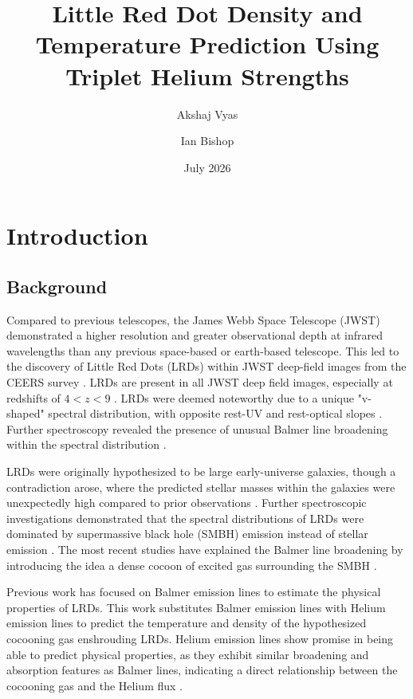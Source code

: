 \documentclass[letterpaper]{aastex701}
\begin{document}
\title{Little Red Dot Density and Temperature Prediction Using Triplet Helium Strengths}

\author{Akshaj Vyas}  

\author{Ian Bishop} 

\date{July 2026}

\section{Introduction}

\subsection{Background}

Compared to previous telescopes, the James Webb Space Telescope (JWST) demonstrated a higher resolution and greater observational depth at infrared wavelengths than any previous space-based or earth-based telescope. This led to the discovery of Little Red Dots (LRDs) within JWST deep-field images from the CEERS survey \citep{Finkelstein_2025}. LRDs are present in all JWST deep field images, especially at redshifts of  $4 < z < 9$ \citep{kokorev2025deepestglimpsedensegas}. LRDs were deemed noteworthy due to a unique "v-shaped" spectral distribution, with opposite rest-UV and rest-optical slopes \citep{Matthee_2024} \citep{Kocevski_2025}. Further spectroscopy revealed the presence of unusual Balmer line broadening within the spectral distribution \citep{Kocevski_2025} \citep{Taylor_2025}. 

LRDs were originally hypothesized to be large early-universe galaxies, though a contradiction arose, where the predicted stellar masses within the galaxies were unexpectedly high compared to prior observations \citep{Labbe2023}. Further spectroscopic investigations demonstrated that the spectral distributions of LRDs were dominated by supermassive black hole (SMBH) emission instead of stellar emission \citep{Kocevski_2025} \citep{Taylor_2025}. The most recent studies have explained the Balmer line broadening by introducing the idea a dense cocoon of excited gas surrounding the SMBH \citep{2025arXiv250316596N} \citep{Rusakov2026}.

Previous work has focused on Balmer emission lines to estimate the physical properties of LRDs. This work substitutes Balmer emission lines with Helium emission lines to predict the temperature and density of the hypothesized cocooning gas enshrouding LRDs. Helium emission lines show promise in being able to predict physical properties, as they exhibit similar broadening and absorption features as Balmer lines, indicating a direct relationship between the cocooning gas and the Helium flux \citep{Juod_balis_2024} \citep{Wang__2025} \citep{kokorev2025deepestglimpsedensegas}  \citep{de_Graaff_2025}.
\end{document}
